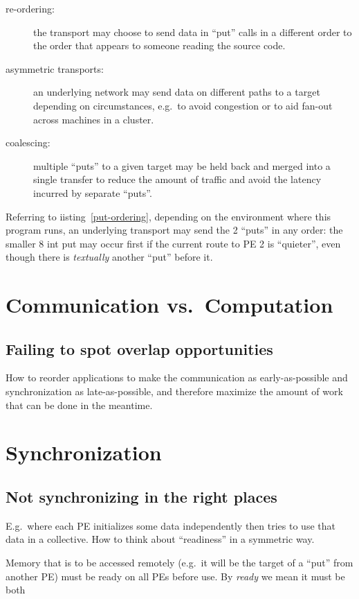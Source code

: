 \begin{description}
\item[re-ordering:] the transport may choose to send data in ``put''
  calls in a different order to the order that appears to someone
  reading the source code.
\item[asymmetric transports:] an underlying network may send data on
  different paths to a target depending on circumstances, e.g.\ to
  avoid congestion or to aid fan-out across machines in a cluster.
\item[coalescing:] multiple ``puts'' to a given target may be held
  back and merged into a single transfer to reduce the amount of
  traffic and avoid the latency incurred by separate ``puts''.
\end{description}

Referring to iisting~\ref{put-ordering}, depending on the environment
where this program runs, an underlying transport may send the 2
``puts'' in any order: the smaller 8 int put may occur first if the
current route to PE 2 is ``quieter'', even though there is
\emph{textually} another ``put'' before it.

\section{Communication vs.\ Computation}

\subsection{Failing to spot overlap opportunities}

How to reorder applications to make the communication as
early-as-possible and synchronization as late-as-possible, and
therefore maximize the amount of work that can be done in the
meantime.

\section{Synchronization}

\subsection{Not synchronizing in the right places}

E.g.\ where each PE initializes some data independently then tries
to use that data in a collective.  How to think about ``readiness''
in a symmetric way.

Memory that is to be accessed remotely (e.g.\ it will be the target of
a ``put'' from another PE) must be ready on all PEs before use.  By
\emph{ready} we mean it must be both

